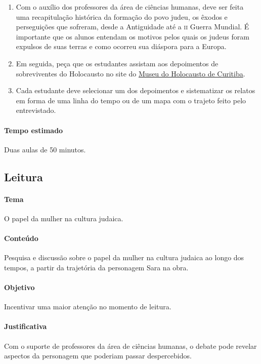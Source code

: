 \documentclass[12pt]{extarticle}
\begin{document}
\begin{enumerate}

\item Com o auxílio dos professores da área de ciências humanas,
deve ser feita uma recapitulação histórica da formação do povo judeu, 
os êxodos e perseguições
que sofreram, desde a Antiguidade até a \textsc{ii} Guerra Mundial. 
É importante que os alunos entendam os motivos pelos quais os judeus 
foram expulsos de suas terras e como ocorreu sua diáspora para a Europa. 

\item Em seguida, peça que os estudantes assistam aos depoimentos 
de sobreviventes do Holocausto no site 
do \href{https://www.museudoholocausto.org.br/depoimentos/}{Museu do Holocausto de Curitiba}.

\item Cada estudante deve selecionar um dos depoimentos e 
sistematizar os relatos em forma de uma linha do tempo 
ou de um mapa com o trajeto feito pelo entrevistado.

\end{enumerate}

\paragraph{Tempo estimado} Duas aulas de 50 minutos.


\subsection{Leitura}

\paragraph{Tema} O papel da mulher na cultura judaica.

\paragraph{Conteúdo} Pesquisa e discussão sobre
o papel da mulher na cultura judaica ao longo dos tempos, 
a partir da trajetória da personagem Sara na obra.

\paragraph{Objetivo} Incentivar uma maior atenção no momento de leitura.

\paragraph{Justificativa} Com o suporte de professores da área
de ciências humanas, o debate pode revelar aspectos da personagem
que poderiam passar despercebidos.
\end{document}
